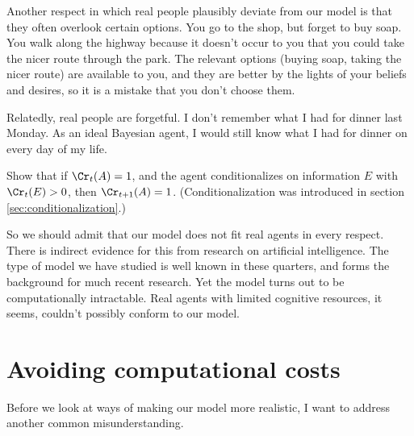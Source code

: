 Another respect in which real people plausibly deviate from our model
is that they often overlook certain options. You go to the shop, but
forget to buy soap. You walk along the highway because it doesn't
occur to you that you could take the nicer route through the park. The
relevant options (buying soap, taking the nicer route) are available
to you, and they are better by the lights of your beliefs and desires,
so it is a mistake that you don't choose them.

Relatedly, real people are forgetful. I don't remember what I had for
dinner last Monday. As an ideal Bayesian agent, I would still know
what I had for dinner on every day of my life.

\begin{exercise}{2}
  Show that if $\Cr_t(A) = 1$, and the agent conditionalizes on
  information $E$ with $\Cr_t(E) > 0$, then $\Cr_{t+1}(A) =
  1$. (Conditionalization was introduced in
  section \ref{sec:conditionalization}.) 
\end{exercise}


So we should admit that our model does not fit real agents in every
respect. There is indirect evidence for this from research on
artificial intelligence. The type of model we have studied is well
known in these quarters, and forms the background for much recent
research.%
Yet the model turns out to be computationally intractable. Real agents
with limited cognitive resources, it seems, couldn't possibly conform
to our model.


\section{Avoiding computational costs}

Before we look at ways of making our model more realistic, I want to
address another common misunderstanding.

